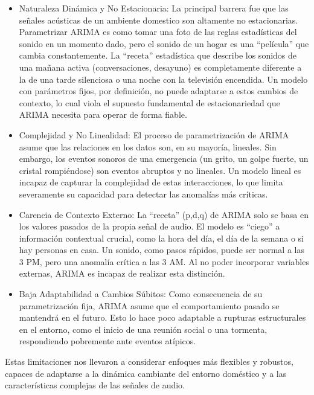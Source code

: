 \begin{enumerate}
            \begin{itemize}
                  \item Naturaleza Dinámica y No Estacionaria: La principal barrera fue que las señales acústicas de un ambiente domestico son altamente no estacionarias. Parametrizar ARIMA es como tomar una foto de las reglas estadísticas del sonido en un momento dado, pero el sonido de un hogar es una ``película'' que cambia constantemente. La ``receta'' estadística que describe los sonidos de una mañana activa (conversaciones, desayuno) es completamente diferente a la de una tarde silenciosa o una noche con la televisión encendida. Un modelo con parámetros fijos, por definición, no puede adaptarse a estos cambios de contexto, lo cual viola el supuesto fundamental de estacionariedad que ARIMA necesita para operar de forma fiable.
                  \item Complejidad y No Linealidad: El proceso de parametrización de ARIMA asume que las relaciones en los datos son, en su mayoría, lineales. Sin embargo, los eventos sonoros de una emergencia (un grito, un golpe fuerte, un cristal rompiéndose) son eventos abruptos y no lineales. Un modelo lineal es incapaz de capturar la complejidad de estas interacciones, lo que limita severamente su capacidad para detectar las anomalías más críticas.
                  \item Carencia de Contexto Externo: La ``receta'' (p,d,q) de ARIMA solo se basa en los valores pasados de la propia señal de audio. El modelo es ``ciego'' a información contextual crucial, como la hora del día, el día de la semana o si hay personas en casa. Un sonido, como pasos rápidos, puede ser normal a las 3 PM, pero una anomalía crítica a las 3 AM. Al no poder incorporar variables externas, ARIMA es incapaz de realizar esta distinción.
                  \item Baja Adaptabilidad a Cambios Súbitos: Como consecuencia de su parametrización fija, ARIMA asume que el comportamiento pasado se mantendrá en el futuro. Esto lo hace poco adaptable a rupturas estructurales en el entorno, como el inicio de una reunión social o una tormenta, respondiendo pobremente ante eventos atípicos.
            \end{itemize}

            Estas limitaciones nos llevaron a considerar enfoques más flexibles y robustos, capaces de adaptarse a la dinámica cambiante del entorno doméstico y a las características complejas de las señales de audio.


\end{enumerate}
